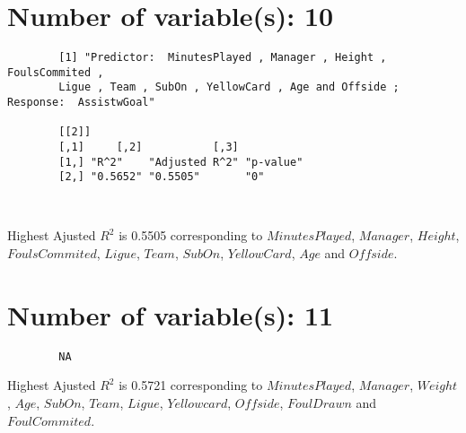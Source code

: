 \documentclass[12pt]{article}
\begin{document}
	\section{Number of variable(s): 10}
	\begin{verbatim}
		[1] "Predictor:  MinutesPlayed , Manager , Height , FoulsCommited , 
		Ligue , Team , SubOn , YellowCard , Age and Offside ; Response:  AssistwGoal"
		
		[[2]]
		[,1]     [,2]           [,3]     
		[1,] "R^2"    "Adjusted R^2" "p-value"
		[2,] "0.5652" "0.5505"       "0"      
		
		
	\end{verbatim}
	
	Highest Ajusted $ R^2 $ is 0.5505 corresponding to $ MinutesPlayed $, $ Manager $, $ Height $, $ FoulsCommited $, $ Ligue $, $ Team $, $ SubOn $, $ YellowCard $, $ Age $ and $ Offside $.
	
	\section{Number of variable(s): 11}
	\begin{verbatim}
		NA
	\end{verbatim}
	
	
		Highest Ajusted $ R^2 $ is 0.5721 corresponding to $ MinutesPlayed $, $ Manager $, $ Weight $, $ Age $, $ SubOn $, $ Team $, $ Ligue $, $ Yellowcard $, $ Offside $, $ FoulDrawn $ and $ FoulCommited $.
	
	
	
\end{document}

